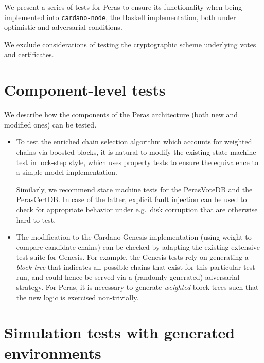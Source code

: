 We present a series of tests for Peras to ensure its functionality when being implemented into \texttt{cardano-node}, the Haskell implementation, both under optimistic and adversarial conditions.

We exclude considerations of testing the cryptographic scheme underlying votes and certificates.

\section{Component-level tests}

We describe how the components of the Peras architecture (both new and modified ones) can be tested.

\begin{itemize}
\item
  To test the enriched chain selection algorithm which accounts for weighted chains via boosted blocks, it is natural to modify the existing state machine test in lock-step style, which uses property tests to ensure the equivalence to a simple model implementation.

  Similarly, we recommend state machine tests for the PerasVoteDB and the PerasCertDB.
  In case of the latter, explicit fault injection can be used to check for appropriate behavior under e.g.~disk corruption that are otherwise hard to test.
\item
  The modification to the Cardano Genesis implementation (using weight to compare candidate chains) can be checked by adapting the existing extensive test suite for Genesis.
  For example, the Genesis tests rely on generating a \emph{block tree} that indicates all possible chains that exist for this particular test run, and could hence be served via a (randomly generated) adversarial strategy.
  For Peras, it is necessary to generate \emph{weighted} block trees such that the new logic is exercised non-trivially.
\end{itemize}

\section{Simulation tests with generated environments}

